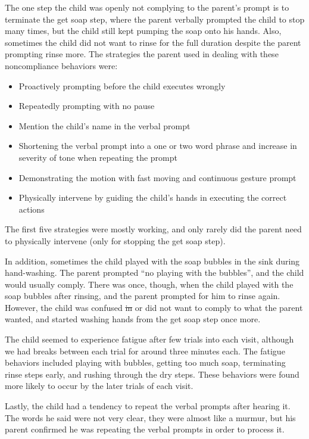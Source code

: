 \documentclass{ut-thesis}
\providecommand{\DIFdeltex}[1]{{\protect\color{red}\sout{#1}}}                      %
\providecommand{\DIFdelbegin}{} %
\providecommand{\DIFdelend}{} %
\providecommand{\DIFdel}[1]{\texorpdfstring{\DIFdeltex{#1}}{}} %
\begin{document}
The one step the child was openly not complying to the parent's prompt is to terminate the get soap step, where the parent verbally prompted the child to stop many times, but the child still kept pumping the soap onto his hands.  Also, sometimes the child did not want to rinse for the full duration despite the parent prompting rinse more.  The strategies the parent used in dealing with these noncompliance behaviors were:
\begin{itemize}
	\item Proactively prompting before the child executes wrongly
	\item Repeatedly prompting with no pause
	\item Mention the child's name in the verbal prompt
	\item Shortening the verbal prompt into a one or two word phrase and increase in severity of tone when repeating the prompt
	\item Demonstrating the motion with fast moving and continuous gesture prompt
	\item Physically intervene by guiding the child's hands in executing the correct actions
\end{itemize}
The first five strategies were mostly working, and only rarely did the parent need to physically intervene (only for stopping the get soap step).

In addition, sometimes the child played with the soap bubbles in the sink during hand-washing.  The parent prompted ``no playing with the bubbles'', and the child would usually comply.  There was once, though, when the child played with the soap bubbles after rinsing, and the parent prompted for him to rinse again.  However, the child was confused \DIFdelbegin \DIFdel{in }\DIFdelend or did not want to comply to what the parent wanted, and started washing hands from the get soap step once more.

The child seemed to experience fatigue after few trials into each visit, although we had breaks between each trial for around three minutes each.  The fatigue behaviors included playing with bubbles, getting too much soap, terminating rinse steps early, and rushing through the dry steps.  These behaviors were found more likely to occur by the later trials of each visit.

Lastly, the child had a tendency to repeat the verbal prompts after hearing it.  The words he said were not very clear, they were almost like a murmur, but his parent confirmed he was repeating the verbal prompts in order to process it.
\end{document}
